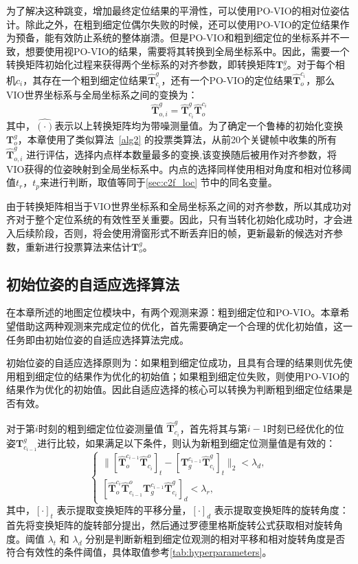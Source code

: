 为了解决这种跳变，增加最终定位结果的平滑性，可以使用PO-VIO的相对位姿估计。除此之外，在粗到细定位偶尔失败的时候，还可以使用PO-VIO的定位结果作为预备，能有效防止系统的整体崩溃。但是PO-VIO和粗到细定位的坐标系并不一致，想要使用视PO-VIO的结果，需要将其转换到全局坐标系中。因此，需要一个转换矩阵初始化过程来获得两个坐标系的对齐参数，即转换矩阵$\symbf{T}_o^{g}$。对于每个相机$c_i$，其存在一个粗到细定位结果$\hat{\symbf{T}}^{g}_{c_i}$，还有一个PO-VIO的定位结果$\hat{\symbf{T}}_{o}^{c_i}$，那么VIO世界坐标系与全局坐标系之间的变换为：
\begin{equation}
    \hat{\symbf{T}}_{o,i}^g = {\hat{\symbf{T}}^{g}_{c_i}} \hat{\symbf{T}}_{o}^{c_i}
\end{equation}
其中，${\hat{(\cdot)}}$表示以上转换矩阵均为带噪测量值。为了确定一个鲁棒的初始化变换$\symbf{T}_{o}^g$，本章使用了类似算法~\ref{alg2} 的投票类算法，从前20个关键帧中收集的所有$\hat{\symbf{T}}_{o,i}^g$ 进行评估，选择内点样本数量最多的变换,该变换随后被用作对齐参数，将VIO获得的位姿映射到全局坐标系中。内点的选择同样使用相对角度和相对位移阈值$t_r$，$t_p$来进行判断，取值等同于\ref{sec:c2f_loc} 节中的同名变量。

由于转换矩阵相当于VIO世界坐标系和全局坐标系之间的对齐参数，所以其成功对齐对于整个定位系统的有效性至关重要。因此，只有当转化初始化成功时，才会进入后续阶段，否则，将会使用滑窗形式不断丢弃旧的帧，更新最新的候选对齐参数，重新进行投票算法来估计$\symbf{T}_o^{g}$。

\subsection{初始位姿的自适应选择算法}
\label{sec:valid}

在本章所述的地图定位模块中，有两个观测来源：粗到细定位和PO-VIO。本章希望借助这两种观测来完成定位的优化，首先需要确定一个合理的优化初始值，这一任务即由初始位姿的自适应选择算法完成。

初始位姿的自适应选择原则为：如果粗到细定位成功，且具有合理的结果则优先使用粗到细定位的结果作为优化的初始值；如果粗到细定位失败，则使用PO-VIO的结果作为优化的初始值。因此自适应选择的核心可以转换为判断粗到细定位结果是否有效。

对于第$i$时刻的粗到细定位位姿测量值 ${\hat{\symbf{T}}^{g}_{c_i}}$，首先将其与第$i-1$时刻已经优化的位姿${\symbf{T}}^{g}_{c_{i-1}}$进行比较，如果满足以下条件，则认为新粗到细定位测量值是有效的：
\begin{equation}
\label{eq:check}
\begin{cases}
    \|[\hat{\symbf{T}}_{o}^{c_{i-1}}\hat{\symbf{T}}^{o}_{c_i}]_{t} - [\symbf{T}_{g}^{c_{i-1}}\hat{\symbf{T}}^{g}_{c_i}]_{t} \|_2 < \lambda_{d}, \\
    [\hat{\symbf{T}}^{c_i}_o \hat{\symbf{T}}_{c_{i-1}}^o \symbf{T}^{c_{i-1}}_g \hat{\symbf{T}}_{c_{i}}^g]_{d} < \lambda_{r},
\end{cases}
\end{equation}
其中，$[\cdot]_{t}$ 表示提取变换矩阵的平移分量，$[\cdot]_{d}$ 表示提取变换矩阵的旋转角度：首先将变换矩阵的旋转部分提出，然后通过罗德里格斯旋转公式获取相对旋转角度。阈值 $\lambda_{t}$ 和 $\lambda_{d}$ 分别是判断新粗到细定位观测的相对平移和相对旋转角度是否符合有效性的条件阈值，具体取值参考\ref{tab:hyperparameters}。

